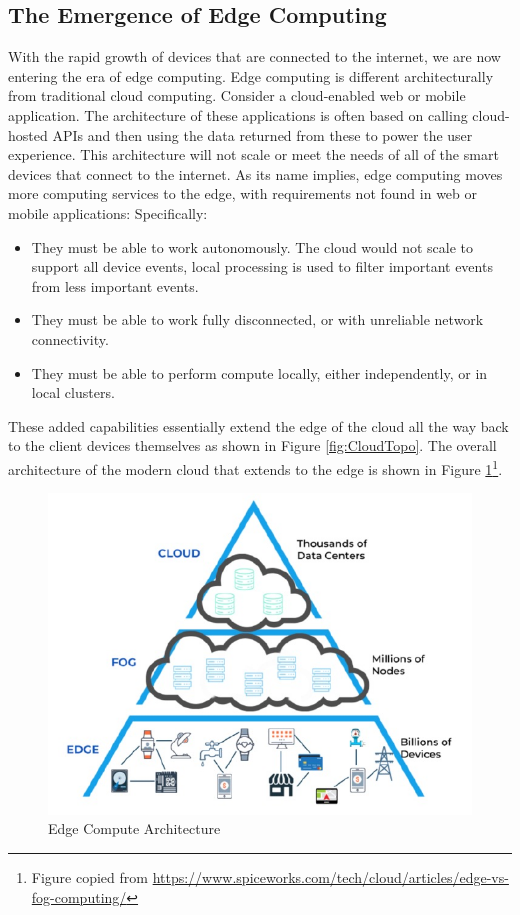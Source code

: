 \documentclass[conference]{IEEEtran}
\begin{document}
\subsection{The Emergence of Edge Computing}
\label{subsec:Edge}

With the rapid growth of devices that are connected to the internet, we are now entering the era of edge computing\cite{edgecomputing}. Edge computing is  different architecturally from traditional cloud computing.  Consider a cloud-enabled web or mobile application.  The architecture of these applications is often based on calling cloud-hosted APIs and then using the data returned from these to power the user experience.  This architecture will not scale or meet the needs of all of the smart devices that connect to the internet.  As its name implies, edge computing moves more computing services to the edge, with requirements not found in web or mobile applications:  Specifically:

\begin{itemize}
	\item They must be able to work autonomously. The cloud would not scale to support all device events, local processing is used to filter important events from less important events.
	
	\item They must be able to work fully disconnected, or with unreliable network connectivity.  
	
	\item They must be able to perform compute locally, either independently, or in local clusters. 
\end{itemize}

These added capabilities essentially extend the edge of the cloud all the way back to the client devices themselves as shown in Figure \ref{fig:CloudTopo}. The overall architecture of the modern cloud that extends to the edge is shown in Figure \ref{fig:EdgeArchitecture}\footnote{Figure copied from \url{https://www.spiceworks.com/tech/cloud/articles/edge-vs-fog-computing/}}.


\begin{figure}
	\includegraphics[width=\columnwidth]{images/EdgeArchitecture}	
	\caption{Edge Compute Architecture}
	\label{fig:EdgeArchitecture}
\end{figure}
\end{document}
